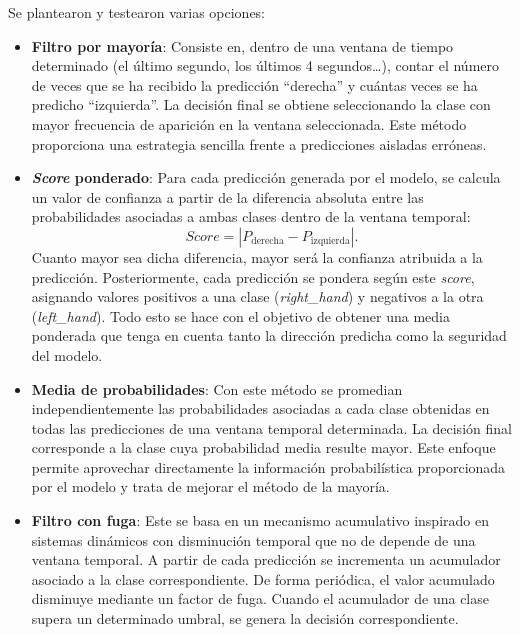 Se plantearon y testearon varias opciones:

\begin{itemize}
    \item \textbf{Filtro por mayoría}: Consiste en, dentro de una ventana de tiempo determinado (el último segundo, los últimos 4 segundos\dots), contar el número de veces que se ha recibido la predicción ``derecha'' y cuántas veces se ha predicho ``izquierda''. La decisión final se obtiene seleccionando la clase con mayor frecuencia de aparición en la ventana seleccionada. Este método proporciona una estrategia sencilla frente a predicciones aisladas erróneas.
    \item \textbf{\textit{Score} ponderado}:  Para cada predicción generada por el modelo, se calcula un valor de confianza a partir de la diferencia absoluta entre las probabilidades asociadas a ambas clases dentro de la ventana temporal:
    \[\textit{Score} = \left|P_{\text{derecha}} - P_{\text{izquierda}}\right|.\]
    Cuanto mayor sea dicha diferencia, mayor será la confianza atribuida a la predicción. Posteriormente, cada predicción se pondera según este \textit{score}, asignando valores positivos a una clase (\textit{right\_hand}) y negativos a la otra (\textit{left\_hand}). Todo esto se hace con el objetivo de obtener una media ponderada que tenga en cuenta tanto la dirección predicha como la seguridad del modelo.
    \item \textbf{Media de probabilidades}: Con este método se promedian independientemente las probabilidades asociadas a cada clase obtenidas en todas las predicciones de una ventana temporal determinada. La decisión final corresponde a la clase cuya probabilidad media resulte mayor. Este enfoque permite aprovechar directamente la información probabilística proporcionada por el modelo y trata de mejorar el método de la mayoría.
    \item \textbf{Filtro con fuga}: Este se basa en un mecanismo acumulativo inspirado en sistemas dinámicos con disminución temporal que no de depende de una ventana temporal. A partir de cada predicción se incrementa un acumulador asociado a la clase correspondiente. De forma periódica, el valor acumulado disminuye mediante un factor de fuga. Cuando el acumulador de una clase supera un determinado umbral, se genera la decisión correspondiente.

\end{itemize}
